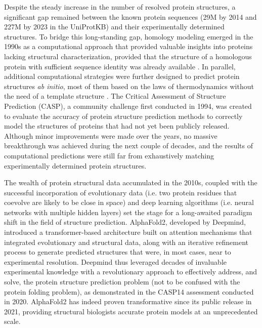 Despite the steady increase in the number of resolved protein structures, a significant gap remained between the known protein sequences (29M by 2014 and 227M by 2023 in the UniProtKB) and their experimentally determined structures\cite{the_uniprot_consortium_uniprot_2023}. To bridge this long-standing gap, homology modeling emerged in the 1990s as a computational approach that provided valuable insights into proteins lacking structural characterization, provided that the structure of a homologous protein with sufficient sequence identity was already available \cite{marti-renom_comparative_2000, schwede_swiss-model_2003}. In parallel, additional computational strategies were further designed to predict protein structures \textit{ab initio}, most of them based on the laws of thermodynamics without the need of a template structure \cite{bertoline_before_2023}. The Critical Assessment of Structure Prediction (CASP), a community challenge first conducted in 1994, was created to evaluate the accuracy of protein structure prediction methods to correctly model the structures of proteins that had not yet been publicly released\cite{moult_largescale_1995}. Although minor improvements were made over the years, no massive breakthrough was achieved during the next couple of decades, and the results of computational predictions were still far from exhaustively matching experimentally determined protein structures\cite{moult_critical_2018}.

The wealth of protein structural data accumulated in the 2010s, coupled with the successful incorporation of evolutionary data (i.e. two protein residues that coevolve are likely to be close in space) and deep learning algorithms (i.e. neural networks with multiple hidden layers) set the stage for a long-awaited paradigm shift in the field of structure prediction. AlphaFold2, developed by Deepmind, introduced a transformer-based architecture built on attention mechanisms that integrated evolutionary and structural data, along with an iterative refinement process to generate predicted structures that were, in most cases, near to experimental resolution\cite{jumper_highly_2021}. Deepmind thus leveraged decades of invaluable experimental knowledge with a revolutionary approach to effectively address, and solve, the protein structure prediction problem (not to be confused with the protein folding problem), as demonstrated in the CASP14 assessment conducted in 2020\cite{pereira_highaccuracy_2021}. AlphaFold2 has indeed proven transformative since its public release in 2021, providing structural biologists accurate protein models at an unprecedented scale\cite{tunyasuvunakool_highly_2021, bryant_improved_2022, wong_benchmarking_2022}.  

